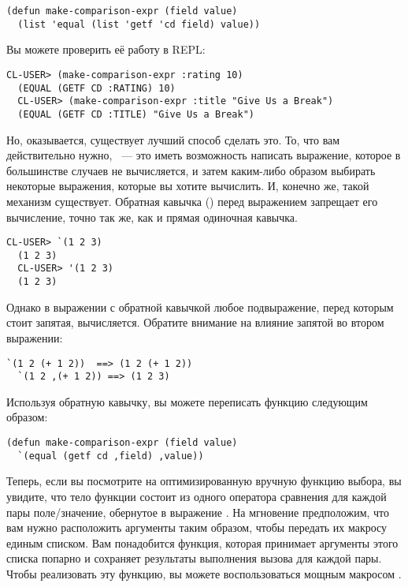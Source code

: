 \begin{lstlisting}
(defun make-comparison-expr (field value)
  (list 'equal (list 'getf 'cd field) value))
\end{lstlisting}

Вы можете проверить её работу в REPL:

\begin{lstlisting}[style=lisprepl]
  CL-USER> (make-comparison-expr :rating 10)
  (EQUAL (GETF CD :RATING) 10)
  CL-USER> (make-comparison-expr :title "Give Us a Break")
  (EQUAL (GETF CD :TITLE) "Give Us a Break")
\end{lstlisting}

Но, оказывается, существует лучший способ сделать это. То, что вам действительно нужно,
~--- это иметь возможность написать выражение, которое в большинстве случаев не
вычисляется, и затем каким-либо образом выбирать некоторые выражения, которые вы хотите
вычислить. И, конечно же, такой механизм существует. Обратная кавычка () перед
выражением запрещает его вычисление, точно так же, как и прямая одиночная кавычка.

\begin{lstlisting}[style=lisprepl]
  CL-USER> `(1 2 3)
  (1 2 3)
  CL-USER> '(1 2 3)
  (1 2 3)
\end{lstlisting}

Однако в выражении с обратной кавычкой любое подвыражение, перед которым стоит запятая,
вычисляется. Обратите внимание на влияние запятой во втором выражении:

\begin{lstlisting}[style=lisprepl]
  `(1 2 (+ 1 2))  ==> (1 2 (+ 1 2))
  `(1 2 ,(+ 1 2)) ==> (1 2 3)
\end{lstlisting}

Используя обратную кавычку, вы можете переписать функцию  следующим образом:

\begin{lstlisting}
(defun make-comparison-expr (field value)
  `(equal (getf cd ,field) ,value))
\end{lstlisting}

Теперь, если вы посмотрите на оптимизированную вручную функцию выбора, вы увидите, что
тело функции состоит из одного оператора сравнения для каждой пары поле/значение,
обернутое в выражение . На мгновение предположим, что вам нужно расположить
аргументы таким образом, чтобы передать их макросу  единым списком. Вам
понадобится функция, которая принимает аргументы этого списка попарно и сохраняет
результаты выполнения вызова  для каждой пары. Чтобы
реализовать эту функцию, вы можете воспользоваться мощным макросом .

